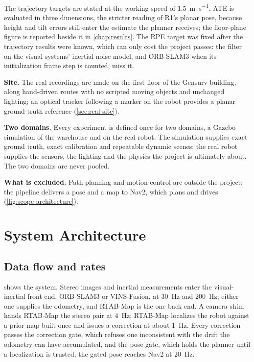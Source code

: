 The trajectory targets are stated at the working speed of
\SI{1.5}{\metre\per\second}. ATE is evaluated in three dimensions, the stricter reading of R1's planar pose,
because height and tilt errors still enter the estimate the planner receives;
the floor-plane figure is reported beside it in \cref{chap:results}. The RPE
target was fixed after the trajectory results were known, which can only cost the project passes: the filter on the
visual systems' inertial noise model, and ORB-SLAM3 when its initialization
frame step is counted, miss it. 

\textbf{Site.} The real recordings are made on the first floor of the
Gensurv building, along hand-driven routes with no scripted moving objects and
unchanged lighting; an optical tracker following a marker on the robot
provides a planar ground-truth reference (\cref{sec:real-site}).

\textbf{Two domains.} Every experiment is defined once for two domains, a
Gazebo simulation of the warehouse and on the real robot. The simulation
supplies exact ground truth, exact calibration and repeatable dynamic scenes;
the real robot supplies the sensors, the lighting and the physics the project
is ultimately about. The two domains are never pooled.

\textbf{What is excluded.} Path planning and motion control are outside the
project: the pipeline delivers a pose and a map to Nav2, which plans and drives
(\cref{fig:scope-architecture}).

\section{System Architecture}
\label{sec:architecture}

\subsection{Data flow and rates}

 shows the system. Stereo images and inertial
measurements enter the visual-inertial front end, ORB-SLAM3 or VINS-Fusion,
at \SI{30}{\hertz} and \SI{200}{\hertz}; either one supplies the odometry, and
RTAB-Map is the one back end. A camera shim hands RTAB-Map the stereo pair at
\SI{4}{\hertz}; RTAB-Map localizes the robot against a prior map built once and
issues a correction at about \SI{1}{\hertz}. Every correction passes the
correction gate, which refuses one inconsistent with the drift the odometry can
have accumulated, and the pose gate, which holds the planner until a
localization is trusted; the gated pose reaches Nav2 at \SI{20}{\hertz}.

